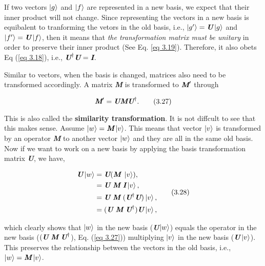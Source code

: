 \documentclass{article}
\begin{document}
If two vectors $\ket{g}$ and $\ket{f}$ are represented in a new basis, we expect that their inner product will not change. 
Since representing the vectors in a new basis is equibalent to tranforming the vetors in the old basis,
i.e., $\ket{g^\prime}=\textit{\textbf{U}}\ket{g}$ and $\ket{f^\prime}=\textit{\textbf{U}}\ket{f}$,
then it means that \textit{the transformation matrix must be unitary} in order to
preserve their inner product (See Eq. {\ref{eq 3.19}}). Therefore, it also obets Eq ({\ref{eq 3.18}}),
i.e., $\textit{\textbf{U}}^\dagger\textit{\textbf{U}}=\textit{\textbf{I}}$.

Similar to vectors, when the basis is changed, matrices also need to be transformed accordingly.
A matrix \textit{\textbf{M}} is transformed to $\textit{\textbf{M}}^\prime$ through

\begin{equation} \label{eq 3.27}
    \textit{\textbf{M}}^\prime= \textit{\textbf{U}}\textit{\textbf{M}}\textit{\textbf{U}}^\dagger.\tag{3.27}
\end{equation} 


This is also called the \textbf{similarity transformation}. It is not diffcult to see that this makes sense. Assume
$\ket{w}=\textit{\textbf{M}}\ket{v}$. This means that vector $\ket{v}$ is transformed
by an operator \textit{\textbf{M}} to another vector $\ket{w}$ and they are all in the same
old basis. Now if we want to work on a new basis by applying the basis transformation matrix 
\textit{\textbf{U}}, we have,

\begin{align} \label{eq 3.28}
    \begin{split}
        \textit{\textbf{U}} \ket{w} &= \textit{\textbf{U}}(\textit{\textbf{M}} \ \ket{v}),\\
        &= \textit{\textbf{U}} \ \textit{\textbf{M}} \ \textit{\textbf{I}}\ket{v},\\
        &= \textit{\textbf{U}} \ \textit{\textbf{M}} \ (\textit{\textbf{U}}^\dagger\textit{\textbf{U}})\ket{v},\\
        &= (\textit{\textbf{U}} \ \textit{\textbf{M}} \ \textit{\textbf{U}}^\dagger)\textit{\textbf{U}}\ket{v},\\
    \end{split} \tag{3.28}
\end{align}

which clearly shows that $\ket{w}$ in the new basis (\textit{\textbf{U}}$\ket{w}$) equals the operator in the new
basis ($(\textit{\textbf{U}} \ \textit{\textbf{M}} \ \textit{\textbf{U}}^\dagger$), Eq. (\ref{eq 3.27})) multiplying $\ket{v}$ in the new basis
 ($\textit{\textbf{U}}\ket{v}$). 
 This preserves the relationship between the vectors in the old basis, i.e., $\ket{w}=\textit{\textbf{M}}\ket{v}$. 
 
\end{document}
